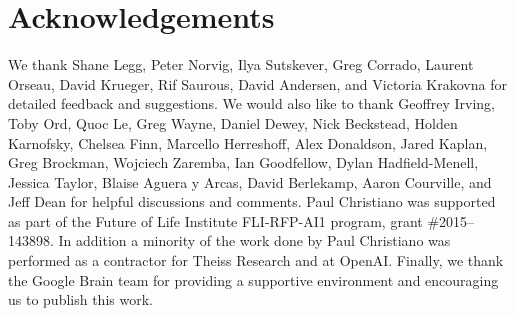 \documentclass[a4paper,10pt]{article}
\begin{document}
\section*{Acknowledgements}
We thank Shane Legg, Peter Norvig, Ilya Sutskever, Greg Corrado, Laurent Orseau, David Krueger, Rif Saurous, David Andersen, and Victoria Krakovna for detailed feedback and suggestions.  We would also like to thank Geoffrey Irving, Toby Ord, Quoc Le, Greg Wayne, Daniel Dewey, Nick Beckstead, Holden Karnofsky, Chelsea Finn, Marcello Herreshoff, Alex Donaldson, Jared Kaplan, Greg Brockman, Wojciech Zaremba, Ian Goodfellow, Dylan Hadfield-Menell, Jessica Taylor, Blaise Aguera y Arcas, David Berlekamp, Aaron Courville, and Jeff Dean for helpful discussions and comments.  Paul Christiano was supported as part of the Future of Life Institute FLI-RFP-AI1 program, grant \#2015–143898.  In addition a minority of the work done by Paul Christiano was performed as a contractor for Theiss Research and at OpenAI.  Finally, we thank the Google Brain team for providing a supportive environment and encouraging us to publish this work.

























\medskip

\printbibliography
\end{document}
